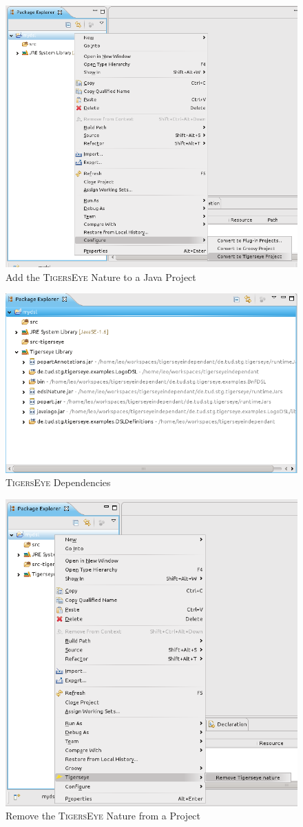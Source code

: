 \documentclass[article,colorback,accentcolor=tud4c]{tudreport}
\newcommand\tiger{%
  \textsc{TigersEye}
}
\begin{document}
	\begin{figure}
	  \centering
	  \includegraphics[width=.5\textwidth,keepaspectratio=true]{./pics/convert_to_tigerseye.png}
	  \caption{Add the \tiger Nature to a Java Project}
	  \label{fig:add_tiger_nature}
	\end{figure}
	
	\begin{figure}
	  \centering
	  \includegraphics[width=.5\textwidth,keepaspectratio=true]{./pics/tigerseye_dependencies.png}
	  \caption{\tiger Dependencies}
	  \label{fig:tiger_added_dependencies}
	\end{figure}
	
	\begin{figure}
	  \centering
	  \includegraphics[width=.5\textwidth,keepaspectratio=true]{./pics/remove_tigerseye_nature.png}
	  \caption{Remove the \tiger Nature from a Project}
	  \label{fig:remove_tiger_nature}
	\end{figure}
	
\end{document}
